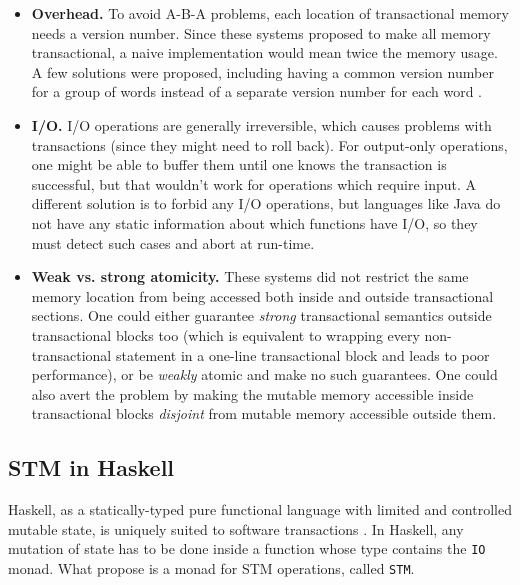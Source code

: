 \documentclass[a4paper]{acmtrans2m}
\begin{document}
\begin{itemize}
\item \textbf{Overhead.} To avoid A-B-A problems, each location of transactional
  memory needs a version number. Since these systems proposed to make all memory
  transactional, a naive implementation would mean twice the memory usage. A few
  solutions were proposed, including having a common version number for a group
  of words instead of a separate version number for each word
  \cite{Harris:2003}.
\item \textbf{I/O.} I/O operations are generally irreversible, which causes
  problems with transactions (since they might need to roll back). For
  output-only operations, one might be able to buffer them until one knows the
  transaction is successful, but that wouldn't work for operations which require
  input. A different solution is to forbid any I/O operations, but languages
  like Java do not have any static information about which functions have I/O,
  so they must detect such cases and abort at run-time.
\item \textbf{Weak vs. strong atomicity.} These systems did not restrict the
  same memory location from being accessed both inside and outside transactional
  sections. One could either guarantee \textit{strong} transactional semantics
  outside transactional blocks too (which is equivalent to wrapping every
  non-transactional statement in a one-line transactional block and leads to
  poor performance), or be \textit{weakly} atomic and make no such
  guarantees. One could also avert the problem by making the mutable memory
  accessible inside transactional blocks \textit{disjoint} from mutable memory
  accessible outside them.
\end{itemize}

\subsection{STM in Haskell}

Haskell, as a statically-typed pure functional language with limited and
controlled mutable state, is uniquely suited to software transactions
\cite{Harris:2005}. In Haskell, any mutation of state has to be done inside a
function whose type contains the \texttt{IO} monad. What 
propose is a monad for STM operations, called \texttt{STM}.
\end{document}
